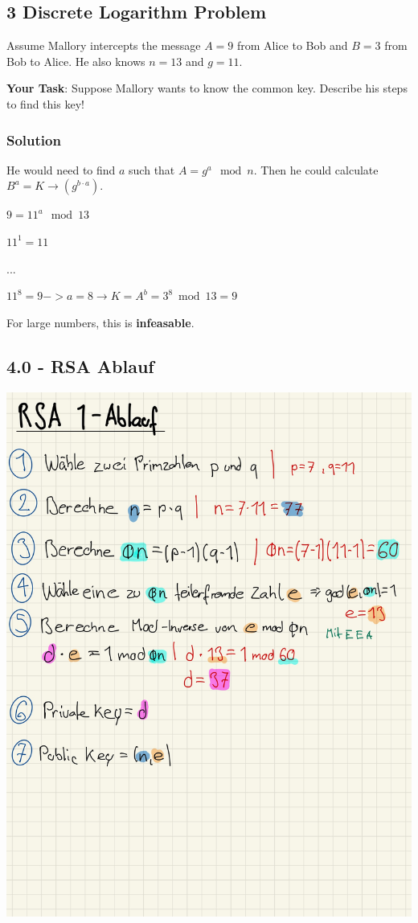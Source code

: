 \documentclass[11pt]{article}
\begin{document}
    \hypertarget{discrete-logarithm-problem}{%
\subsection{3 Discrete Logarithm
Problem}\label{discrete-logarithm-problem}}

Assume Mallory intercepts the message \(A = 9\) from Alice to Bob and
\(B = 3\) from Bob to Alice. He also knows \(n = 13\) and \(g = 11\).

\textbf{Your Task}: Suppose Mallory wants to know the common key.
Describe his steps to find this key!

\hypertarget{solution}{%
\subsubsection{Solution}\label{solution}}

He would need to find \(a\) such that \(A=g^a \mod n\). Then he could
calculate \(B^a=K \rightarrow(g^{b \cdot a})\).

\(9=11^a \mod 13\)

\(11^1 = 11\)

\(...\)

\(11^8 = 9 -> a=8 \rightarrow K = A^b = 3^8 \bmod 13 = 9\)

For large numbers, this is \textbf{infeasable}.

    \hypertarget{rsa-ablauf}{%
\subsection{4.0 - RSA Ablauf}\label{rsa-ablauf}}

\includegraphics{img/rsa_ablauf.jpg}
\end{document}

